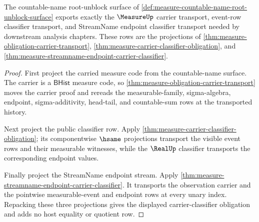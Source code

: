 \begin{theorem}
\label{thm:measure-countable-name-carrier-classifier-obligation}
The countable-name root-unblock surface of
\autoref{def:measure-countable-name-root-unblock-surface} exports exactly the
$\MeasureUp$ carrier transport, event-row classifier transport, and
StreamName endpoint classifier transport needed by downstream analysis
chapters. These rows are the projections of
\autoref{thm:measure-obligation-carrier-transport},
\autoref{thm:measure-carrier-classifier-obligation}, and
\autoref{thm:measure-streamname-endpoint-carrier-classifier}.
\end{theorem}
\begin{proof}
First project the carried measure code from the countable-name surface. The
carrier is a $\mathsf{BHist}$ measure code, so
\autoref{thm:measure-obligation-carrier-transport} moves the carrier proof
and rereads the measurable-family, sigma-algebra, endpoint, sigma-additivity,
head-tail, and countable-sum rows at the transported history.

Next project the public classifier row. Apply
\autoref{thm:measure-carrier-classifier-obligation}; its componentwise
$\hsame$ projections transport the visible event rows and their measurable
witnesses, while the $\RealUp$ classifier transports the corresponding
endpoint values.

Finally project the StreamName endpoint stream. Apply
\autoref{thm:measure-streamname-endpoint-carrier-classifier}. It transports
the observation carrier and the pointwise measurable-event and endpoint rows
at every unary index. Repacking these three projections gives the displayed
carrier-classifier obligation and adds no host equality or quotient row.
\end{proof}

